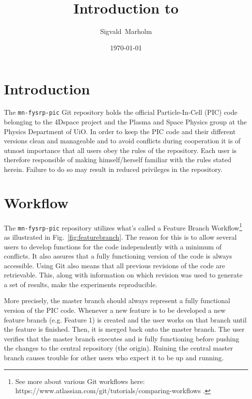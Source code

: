 \documentclass[10pt,a4paper]{article}
\author{Sigvald~Marholm}
\title{Introduction to \mnfysrppic}
\date{\today}
\newcommand{\mnfysrppic}{\texttt{mn-fysrp-pic}}
\newcommand{\reffig}[1]{Fig.~\ref{fig:#1}}
\begin{document}
\maketitle
\newpage

\section{Introduction}
The \mnfysrppic{} Git repository holds the official Particle-In-Cell (PIC) code belonging to the 4Dspace project and the Plasma and Space Physics group at the Physics Department of UiO. In order to keep the PIC code and their different versions clean and manageable and to avoid conflicts during cooperation it is of utmost importance that all users obey the rules of the repository. Each user is therefore responsible of making himself/herself familiar with the rules stated herein. Failure to do so may result in reduced privileges in the repository.

\section{Workflow}
The \mnfysrppic{} repository utilizes what's called a Feature Branch Workflow\footnote{See more about various Git workflows here: https://www.atlassian.com/git/tutorials/comparing-workflows .} as illustrated in \reffig{featurebranch}. The reason for this is to allow several users to develop functions for the code independently with a minimum of conflicts. It also assures that a fully functioning version of the code is always accessible. Using Git also means that all previous revisions of the code are retrievable. This, along with information on which revision was used to generate a set of results, make the experiments reproducible. 

More precisely, the master branch should always represent a fully functional version of the PIC code. Whenever a new feature is to be developed a new feature branch (e.g. Feature 1) is created and the user works on that branch until the feature is finished. Then, it is merged back onto the master branch. The user verifies that the master branch executes and is fully functioning before pushing the changes to the central repository (the origin). Ruining the central master branch causes trouble for other users who expect it to be up and running. 
\end{document}
